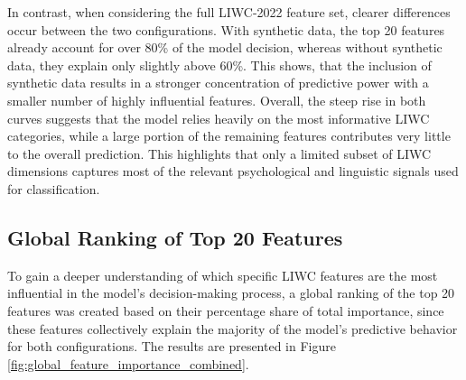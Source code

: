 In contrast, when considering the full LIWC-2022 feature set, clearer differences occur between the two configurations. With synthetic data, the top 20 features already account for over 80\% of the model decision, whereas without synthetic data, they explain only slightly above 60\%. This shows, that the inclusion of synthetic data results in a stronger concentration of predictive power with a smaller number of highly influential features. Overall, the steep rise in both curves suggests that the model relies heavily on the most informative LIWC categories, while a large portion of the remaining features contributes very little to the overall prediction. This highlights that only a limited subset of LIWC dimensions captures most of the relevant psychological and linguistic signals used for classification. 

\subsection{Global Ranking of Top 20 Features}\label{sec:global_ranking_top20}
To gain a deeper understanding of which specific LIWC features are the most influential in the model's decision-making process, a global ranking of the top 20 features was created based on their percentage share of total importance, since these features collectively explain the majority of the model’s predictive behavior for both configurations. The results are presented in Figure \ref{fig:global_feature_importance_combined}.

